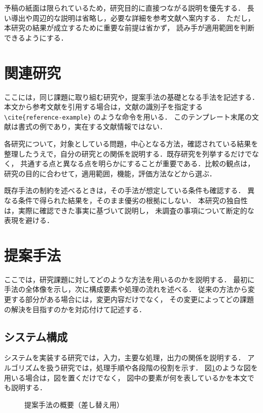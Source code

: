 \documentclass[10pt,twocolumn]{ltjsarticle}
\begin{document}
予稿の紙面は限られているため，研究目的に直接つながる説明を優先する．
長い導出や周辺的な説明は省略し，必要な詳細を参考文献へ案内する．
ただし，本研究の結果が成立するために重要な前提は省かず，
読み手が適用範囲を判断できるようにする．

\section{関連研究}
\label{sec:related}

ここには，同じ課題に取り組む研究や，提案手法の基礎となる手法を記述する．
本文から参考文献を引用する場合は，文献の識別子を指定する
\verb|\cite{reference-example}| のような命令を用いる\cite{reference-example}．
このテンプレート末尾の文献は書式の例であり，実在する文献情報ではない．

各研究について，対象としている問題，中心となる方法，確認されている結果を
整理したうえで，自分の研究との関係を説明する．既存研究を列挙するだけでなく，
共通する点と異なる点を明らかにすることが重要である．比較の観点は，
研究の目的に合わせて，適用範囲，機能，評価方法などから選ぶ．

既存手法の制約を述べるときは，その手法が想定している条件も確認する．
異なる条件で得られた結果を，そのまま優劣の根拠にしない．
本研究の独自性は，実際に確認できた事実に基づいて説明し，
未調査の事項について断定的な表現を避ける．

\section{提案手法}
\label{sec:method}

ここでは，研究課題に対してどのような方法を用いるのかを説明する．
最初に手法の全体像を示し，次に構成要素や処理の流れを述べる．
従来の方法から変更する部分がある場合には，変更内容だけでなく，
その変更によってどの課題の解決を目指すのかを対応付けて記述する．

\subsection{システム構成}
\label{sec:architecture}

システムを実装する研究では，入力，主要な処理，出力の関係を説明する．
アルゴリズムを扱う研究では，処理手順や各段階の役割を示す．
図\ref{fig:overview}のような図を用いる場合は，図を置くだけでなく，
図中の要素が何を表しているかを本文でも説明する．

\begin{figure}
  \centering
  \caption{提案手法の概要（差し替え用）}
  \label{fig:overview}
\end{figure}
\end{document}
